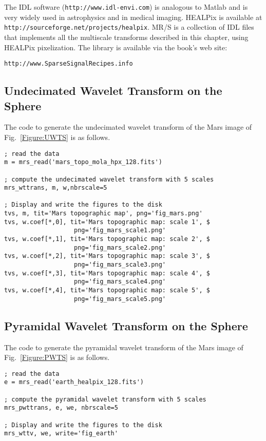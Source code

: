 The IDL software  (\texttt{http://www.idl-envi.com}) is analogous to Matlab and is very widely used in astrophysics and in medical imaging.  
HEALPix is available at 
\texttt{http://sourceforge.net/projects/healpix}.
MR/S is a collection of IDL files that implements all the multiscale transforms described in 
this chapter, using HEALPix pixelization. The library is available via the book's web site: 

{\centerline{\texttt{http://www.SparseSignalRecipes.info}}}


\subsection{Undecimated Wavelet Transform on the Sphere}
The code to generate the undecimated wavelet transform of the Mars 
image of Fig.~\ref{Figure:UWTS} is as follows. 
\begin{verbatim}
; read the data 
m = mrs_read('mars_topo_mola_hpx_128.fits')

; compute the undecimated wavelet transform with 5 scales
mrs_wttrans, m, w,nbrscale=5

; Display and write the figures to the disk
tvs, m, tit='Mars topographic map', png='fig_mars.png'
tvs, w.coef[*,0], tit='Mars topographic map: scale 1', $
                   png='fig_mars_scale1.png' 
tvs, w.coef[*,1], tit='Mars topographic map: scale 2', $
                   png='fig_mars_scale2.png'
tvs, w.coef[*,2], tit='Mars topographic map: scale 3', $
                   png='fig_mars_scale3.png'
tvs, w.coef[*,3], tit='Mars topographic map: scale 4', $
                   png='fig_mars_scale4.png'
tvs, w.coef[*,4], tit='Mars topographic map: scale 5', $
                   png='fig_mars_scale5.png'
\end{verbatim}

\subsection{Pyramidal Wavelet Transform on the Sphere}
The code to generate the pyramidal wavelet transform of the Mars 
image of Fig.~\ref{Figure:PWTS} is as follows.  

\begin{verbatim}
; read the data 
e = mrs_read('earth_healpix_128.fits')

; compute the pyramidal wavelet transform with 5 scales
mrs_pwttrans, e, we, nbrscale=5

; Display and write the figures to the disk
mrs_wttv, we, write='fig_earth'
\end{verbatim}


